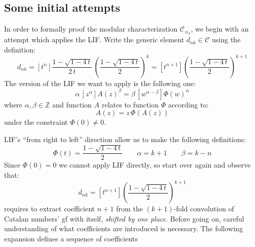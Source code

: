 \subsection{Some initial attempts}

In order to formally proof the modular characterization $\mathcal{C}_{\equiv_{2}}$, 
we begin with an attempt which applies the \ac{LIF}. 
Write the generic element $d_{nk}\in\mathcal{C}$ using the definition:
\begin{displaymath}
    d_{nk} = [t^n] \frac{1-\sqrt{1-4\,t}}{2\,t}\,
        \left(\frac{1-\sqrt{1-4\,t}}{2}\right)^{k}
           = [t^{n+1}] \left(\frac{1-\sqrt{1-4\,t}}{2}\right)^{k+1} 
\end{displaymath}
The version of the \ac{LIF} we want to apply is the following one:
\begin{displaymath}
    \alpha\,\left[z^\alpha\right] A(z)^{\beta} = 
        \beta\,\left[w^{\alpha-\beta}\right]\Phi(w)^{\alpha}
\end{displaymath}
where $\alpha,\beta\in\mathbb{Z}$ and function $A$ relates to function
$\Phi$ according to: 
\begin{displaymath} A(z)=z\,\Phi(A(z)) \end{displaymath}
under the constraint $\Phi(0)\neq0$.
\iffalse
, otherwise a contraddiction arises
(critical relation is emphasized with $\circeq$ symbol):
\begin{displaymath} 
    z\,\Phi(0) \circeq 0 \rightarrow z\circeq\frac{0}{\Phi(0)} 
\end{displaymath}
\fi
\ac{LIF}'s ``from right to left'' direction allow us to make 
the following definitions:
\begin{displaymath}
    \Phi(t)=\frac{1-\sqrt{1-4\,t}}{2}\qquad \alpha=k+1\qquad \beta=k-n
\end{displaymath}
Since $\Phi(0)=0$ we cannot apply \ac{LIF} directly, so start over again 
and observe that:
\begin{displaymath}
    d_{nk}=[t^{n+1}] \left(\frac{1-\sqrt{1-4\,t}}{2}\right)^{k+1} 
\end{displaymath}
requires to extract coefficient $n+1$ from the $(k+1)$-fold
convolution of Catalan numbers' \ac{gf} with itself, \emph{shifted
by one place}. Before going on, careful
understanding of what coefficients are introduced is necessary. 
The following expansion defines a sequence of coefficients 
